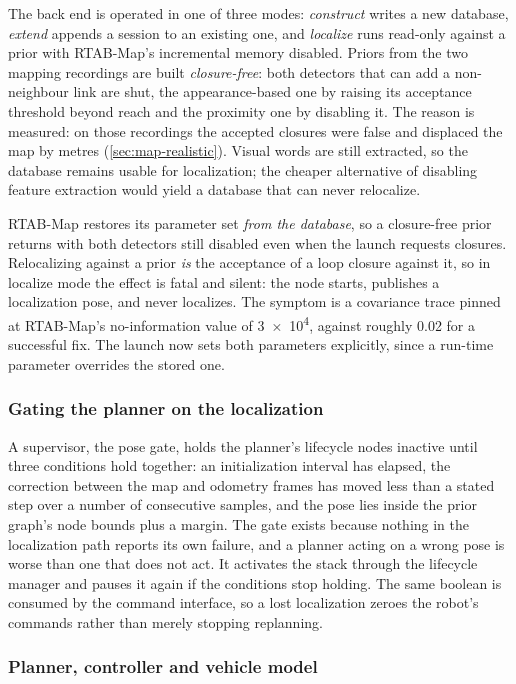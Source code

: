 The back end is operated in one of three modes: \emph{construct} writes a new
database, \emph{extend} appends a session to an existing one, and
\emph{localize} runs read-only against a prior with RTAB-Map's incremental
memory disabled. Priors from the two mapping recordings are built
\emph{closure-free}: both detectors that can add a non-neighbour link are shut,
the appearance-based one by raising its acceptance threshold beyond reach and
the proximity one by disabling it. The reason is measured: on those recordings
the accepted closures were false and displaced the map by metres
(\cref{sec:map-realistic}). Visual words are still extracted, so the database
remains usable for localization; the cheaper alternative of disabling feature
extraction would yield a database that can never relocalize.

RTAB-Map restores its parameter set \emph{from the database}, so a closure-free
prior returns with both detectors still disabled even when the launch requests
closures. Relocalizing against a prior \emph{is} the acceptance of a loop
closure against it, so in localize mode the effect is fatal and silent: the node
starts, publishes a localization pose, and never localizes. The symptom is a
covariance trace pinned at RTAB-Map's no-information value of
\num{3e4}, against roughly \num{0.02} for a successful fix. The launch now
sets both parameters explicitly, since a run-time parameter overrides the stored
one.

\subsubsection{Gating the planner on the localization}

A supervisor, the pose gate, holds the planner's
lifecycle nodes inactive until three conditions hold together: an initialization
interval has elapsed, the correction between the map and odometry frames has
moved less than a stated step over a number of consecutive samples, and the pose
lies inside the prior graph's node bounds plus a margin. The gate exists because
nothing in the localization path reports its own failure, and a planner acting
on a wrong pose is worse than one that does not act. It activates the stack
through the lifecycle manager and pauses it again if the conditions stop
holding. The same boolean is consumed by the
command interface, so a lost localization zeroes the robot's commands rather
than merely stopping replanning.

\subsubsection{Planner, controller and vehicle model}
\label{sec:nav-algorithms}

